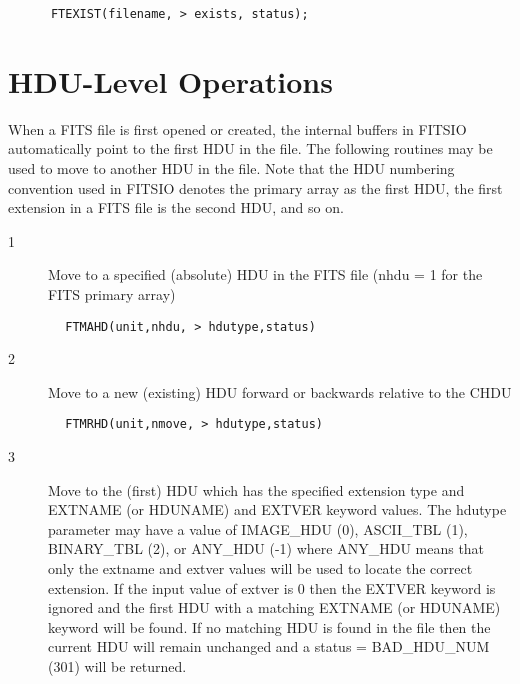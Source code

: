 \documentclass[11pt]{book}
\begin{document}
\begin{verbatim}
      FTEXIST(filename, > exists, status);
\end{verbatim}

\section{HDU-Level Operations \label{FTMAHD}}

When a FITS file is first opened or created, the internal buffers in
FITSIO automatically point to the first HDU in the file.  The following
routines may be used to move to another HDU in the file.  Note that
the HDU numbering convention used in FITSIO  denotes the primary array
as the first HDU, the first extension in a FITS file is the second HDU,
and so on.


\begin{description}
\item[1 ] Move to a specified (absolute) HDU in the FITS file (nhdu = 1 for the
   FITS primary array)
\end{description}

\begin{verbatim}
        FTMAHD(unit,nhdu, > hdutype,status)
\end{verbatim}

\begin{description}
\item[2 ]Move to a new (existing) HDU forward or backwards relative to the CHDU
\end{description}

\begin{verbatim}
        FTMRHD(unit,nmove, > hdutype,status)
\end{verbatim}

\begin{description}
\item[3 ] Move to the (first) HDU which has the specified extension type and
    EXTNAME (or HDUNAME) and EXTVER keyword values.  The hdutype parameter
    may have
    a value of IMAGE\_HDU (0), ASCII\_TBL (1), BINARY\_TBL (2), or ANY\_HDU (-1)
    where ANY\_HDU means that only the extname and extver values will be
    used to locate the correct extension.  If the input value of
    extver is 0 then the EXTVER keyword is ignored and the first HDU
    with a matching EXTNAME (or HDUNAME) keyword will be found.  If no
    matching HDU is found in the file then the current HDU will remain
    unchanged
   and a status = BAD\_HDU\_NUM (301) will be returned.
\end{description}
\end{document}
